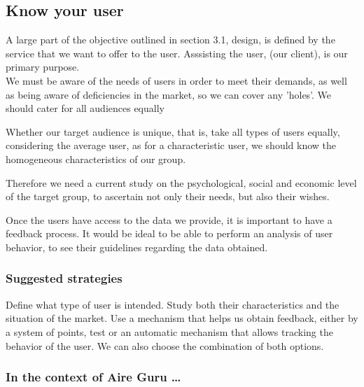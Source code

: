 \subsection{Know your user}

A large part of the objective outlined in section 3.1, design, is defined by the service that we want to offer
to the user. Asssisting the user, (our client), is our primary purpose. \\

We must be aware of the needs of users in order to meet their demands, as well as being aware of deficiencies in the market, so we can cover any 'holes'.
We should cater for all audiences equally 

Whether our target audience is unique, that is, take all types of users equally, considering the
average user, as for a characteristic user, we should know the homogeneous characteristics of our group.

Therefore we need a current study on the psychological, social and economic level of the target group, to ascertain not only
their needs, but also their wishes.

Once the users have access to the data we provide, it is important to have a feedback process.
It would be ideal to be able to perform an analysis of user behavior, to see their guidelines regarding the data obtained.

\subsubsection*{Suggested strategies} 

Define what type of user is intended. Study both their characteristics and the situation of the
market.
Use a mechanism that helps us obtain feedback, either by a system of points, test or
an automatic mechanism that allows tracking the behavior of the user. We can also choose the combination of both
options.

\subsubsection*{In the context of Aire Guru \ldots}

